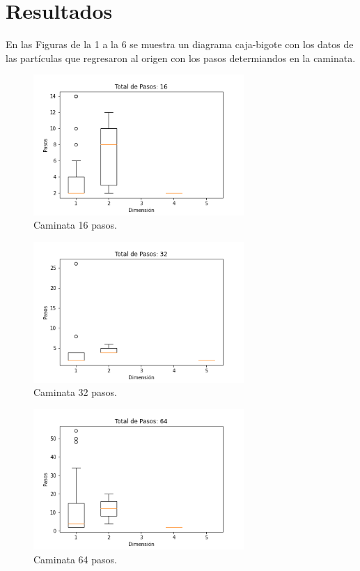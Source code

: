 \documentclass{article}
\begin{document}
\section{Resultados}
En las Figuras de la 1 a la 6 se muestra un diagrama caja-bigote con los datos de las partículas que regresaron al origen con los pasos determiandos en la caminata.

\begin{figure}[H]
\centering
\includegraphics[width=80mm]{p1_pasos_de_16.png}
\caption{\label{fig1}Caminata 16 pasos.}
\end{figure}
\begin{figure}[H]
\centering
\includegraphics[width=80mm]{p1_pasos_de_32.png}
\caption{\label{fig1}Caminata 32 pasos.}
\end{figure}
\begin{figure}[H]
\centering
\includegraphics[width=80mm]{p1_pasos_de_64.png}
\caption{\label{fig1}Caminata 64 pasos.}
\end{figure}
\end{document}
